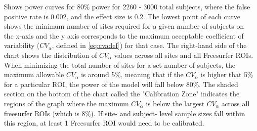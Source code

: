 \label{fig:cv_j} Shows power curves for 80\% power for 2260 - 3000 total subjects, where the false positive rate is 0.002, and the effect size is 0.2. The lowest point of each curve shows the minimum number of sites required for a given number of subjects on the x-axis and the y axis corresponds to the maximum acceptable coefficient of variability ($CV_{\alpha}$, defined in \ref{eq:cvadef}) for that case. The right-hand side of the chart shows the distribution of $CV_{\alpha}$ values across all sites and all Freesurfer ROIs. When minimizing the total number of sites for a set number of subjects, the maximum allowable $CV_{\alpha}$ is around 5\%, meaning that if the $CV_{\alpha}$ is higher that 5\% for a particular ROI, the power of the model will fall below 80\%. The shaded section on the bottom of the chart called the "Calibration Zone" indicates the regions of the graph where the maximum $CV_{\alpha}$ is below the largest $CV_{\alpha}$ across all freesurfer ROIs (which is 8\%). If site- and subject- level sample sizes fall within this region, at least 1 Freesurfer ROI would need to be calibrated.